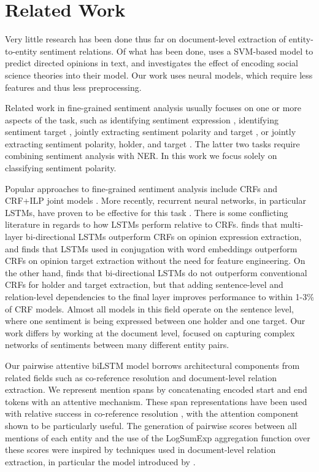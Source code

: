 \documentclass[11pt,a4paper]{article}
\begin{document}
\section{Related Work}
Very little research has been done thus far on document-level extraction of entity-to-entity sentiment relations.
Of what has been done, \citet{Choi:16} uses a SVM-based model to predict directed opinions in text, and investigates the effect of encoding social science theories into their model.
Our work uses neural models, which require less features and thus less preprocessing.
\par Related work in fine-grained sentiment analysis usually
focuses on one or more aspects of the task, such as identifying sentiment expression \citep{Irsoy:14}, identifying sentiment target \citep{Liu:15}, jointly extracting sentiment polarity and target \citep{Mitchell:13}, or jointly extracting sentiment polarity, holder, and target \citep{Katiyar:16, Yang:13}.
The latter two tasks require combining sentiment analysis with NER.
In this work we focus solely on classifying sentiment polarity.
\par Popular approaches to fine-grained sentiment analysis include CRFs \citep{Yang:12, Mitchell:13} and CRF+ILP joint models \citep{Yang:13}.
More recently, recurrent neural networks, in particular LSTMs, have proven to be effective for this task \citep{Liu:15, Irsoy:14}.
There is some conflicting literature in regards to how LSTMs perform relative to CRFs.
\citet{Irsoy:14} finds that multi-layer bi-directional LSTMs outperform CRFs on opinion expression extraction, and \citet{Liu:15} finds that LSTMs used in conjugation with word embeddings outperform CRFs on opinion target extraction without the need for feature engineering.
On the other hand, \citet{Katiyar:16} finds that bi-directional LSTMs do not outperform conventional CRFs for holder and target extraction, but that adding sentence-level and relation-level dependencies to the final layer improves performance to within 1-3\% of CRF models.
Almost all models in this field operate on the sentence level, where one sentiment is being expressed between one holder and one target.
Our work differs by working at the document level, focused on capturing complex networks of sentiments between many different entity pairs.
\par Our pairwise attentive biLSTM model borrows architectural components from related fields such as co-reference resolution and document-level relation extraction.
We represent mention spans by concatenating encoded start and end tokens with an attentive mechanism.
These span representations have been used with relative success in co-reference resolution \citep{Lee:17}, with the attention component shown to be particularly useful.
The generation of pairwise scores between all mentions of each entity and the use of the LogSumExp aggregation function over these scores were inspired by techniques used in document-level relation extraction, in particular the model introduced by \citet{Verga:18}.
\end{document}
